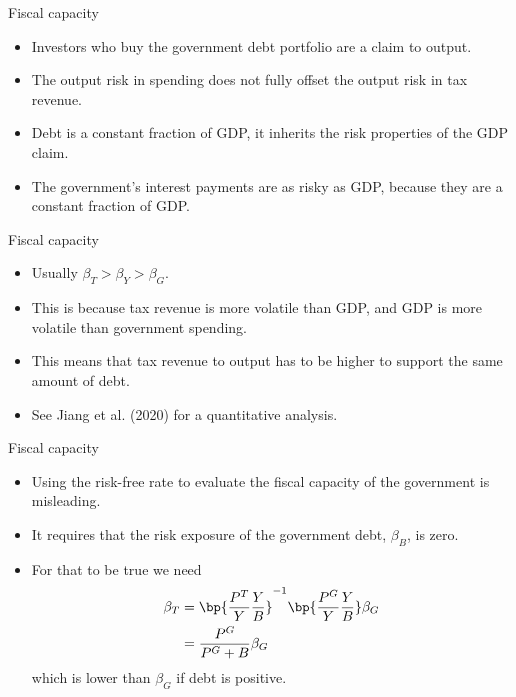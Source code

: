 \documentclass[11pt,xcolor={dvipsnames},aspectratio=159,hyperref={pdftex,pdfpagemode=UseNone,hidelinks,pdfdisplaydoctitle=true},usepdftitle=false]{beamer}
\begin{document}
\begin{frame}{Fiscal capacity}  
    \begin{itemize}
    \item Investors who buy the government
    debt portfolio are  a claim to output. 
    \item The output risk in spending does not fully offset the output risk in tax revenue.
    \item Debt is a constant fraction of GDP,
        it inherits the risk properties of the GDP claim.
    \item The government's interest payments are
        as risky as GDP, because they are a constant fraction of GDP.
    \end{itemize}
\end{frame}

\begin{frame}{Fiscal capacity}  
    \begin{itemize}
    \item Usually $\beta_T > \beta_Y > \beta_G$.
    \item This is because tax revenue is more volatile than GDP, and GDP is more volatile than government spending.
    \item This means that  tax revenue to output has to be higher to support the same amount of debt.
    \item See Jiang et al. (2020) for a quantitative analysis.
    \end{itemize}
\end{frame}

\begin{frame}{Fiscal capacity}  
    \begin{itemize}
    \item Using the risk-free rate to evaluate the fiscal capacity of the government is misleading.
    \item It requires that the risk exposure of the government debt, $\beta_B$, is zero. 
    \item For that to be true we need 
    \begin{align*}
        \beta_T  & =\bp{\frac{P^T}{Y}\frac{Y}{B}}^{-1}  \bp{\frac{P^G}{Y}\frac{Y}{B}} \beta_G \\
            & = \frac{P^G}{P^G+B} \beta_G
    \end{align*}
    which is lower than $\beta_G$ if debt is positive.
    \end{itemize}
\end{frame}
\end{document}
